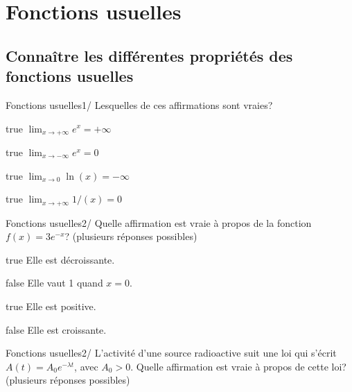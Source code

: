 \documentclass[11pt]{article}
\begin{document}
    \section{Fonctions usuelles}

        \subsection{Connaître les différentes propriétés des fonctions usuelles}
        
        	\begin{question}{30}{Fonctions usuelles}{1}{/}
				Lesquelles de ces affirmations sont vraies?
            \end{question}

            \begin{reponses}
            	\item[true] $\lim_{x\to +\infty} e^x = +\infty$
            	\item[true] $\lim_{x\to -\infty} e^x = 0$
                \item[true] $\lim_{x\to 0} \ln (x) = -\infty$
                \item[true] $\lim_{x\to +\infty} 1/(x) = 0$
            \end{reponses}

            \begin{question}{30}{Fonctions usuelles}{2}{/}
                Quelle affirmation est vraie à propos de la fonction $f(x)=3e^{-x}$? (plusieurs réponses possibles)
            \end{question}

            \begin{reponses}
                \item[true] Elle est décroissante.
                \item[false] Elle vaut 1 quand $x=0$.
                \item[true] Elle est positive.
                \item[false] Elle est croissante.
            \end{reponses}

            \begin{question}{30}{Fonctions usuelles}{2}{/}
                L'activité d'une source radioactive suit une loi qui s'écrit $A(t)=A_0 e^{-\lambda t}$, avec $A_0 > 0$. Quelle affirmation est vraie à propos de cette loi? (plusieurs réponses possibles)
            \end{question}
\end{document}
